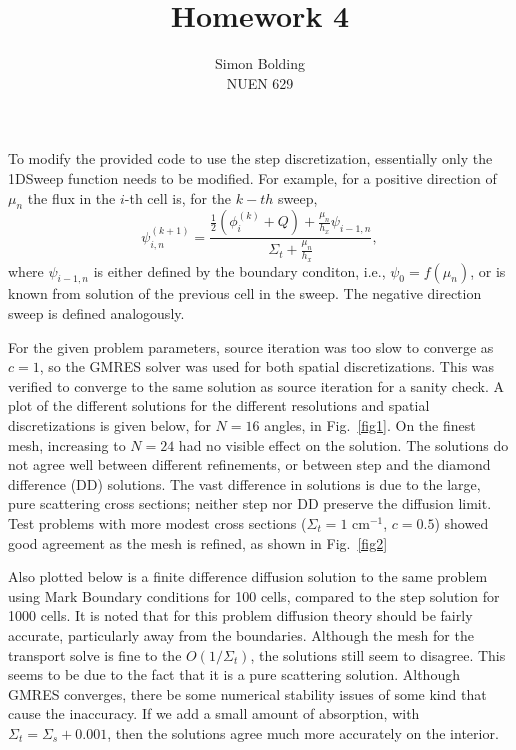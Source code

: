 \documentclass[12pt]{article}
\newenvironment{solnum}[2][Solution]{\begin{trivlist}
\item[\hskip \labelsep {\bfseries #1}\hskip \labelsep {\bfseries #2:}]\hspace{0.3in}\newline\newline}{\end{trivlist}}
\begin{document}
 
 
\title{Homework 4}%
\author{Simon Bolding\\ %
NUEN 629} %
 
\maketitle

\clearpage



\begin{solnum}{1-1}

To modify the provided code to use the step discretization, essentially only the
1DSweep function needs to be modified.  For example, for a positive direction of
$\mu_n$ the flux in the $i$-th cell is, for the $k-th$ sweep,
\begin{equation}
    \psi^{(k+1)}_{i,n} = \frac{\frac{1}{2}\left(\phi^{(k)}_i + Q\right) +
    \frac{\mu_n}{h_x}\psi_{i-1,n}}{\Sigma_t + \frac{\mu_n}{h_x}},
\end{equation}
where $\psi_{i-1,n}$ is either defined by the boundary conditon, i.e., $\psi_{0} =
f(\mu_n)$, or is known from solution of the previous cell in the sweep. The negative
direction sweep is defined analogously. 

For the given problem parameters, source iteration was too slow to converge as $c=1$, so the
GMRES solver was used for both spatial discretizations.  This was verified to
converge to the same solution as source iteration for a sanity check.  A plot of the
different solutions for the different resolutions and spatial discretizations is
given below, for $N=16$ angles, in Fig.~\ref{fig1}. On
the finest mesh, increasing to $N=24$ had no visible effect on the solution.  The
solutions do not agree well between different refinements, or between step and the
diamond difference (DD) solutions.  The vast difference in solutions is due to the
large, pure scattering cross sections; neither step nor DD preserve the diffusion
limit.  Test problems with more modest cross sections ($\Sigma_t=1$ cm$^{-1}$, $c=0.5$)
showed good agreement as the mesh is refined, as shown in Fig.~\ref{fig2}

 Also plotted below is a finite difference diffusion 
solution to the same problem using Mark Boundary conditions for 100 cells, compared
to the step solution for 1000 cells.  It is
noted that for this problem diffusion theory should be fairly accurate, particularly
away from the boundaries.  Although the mesh for the transport solve is fine to the $O(1/\Sigma_t)$, the
solutions still seem to disagree.  This seems to be due to the fact that it is a pure
scattering solution. Although GMRES converges, there be some numerical stability
issues of some kind that cause the inaccuracy.  If we add a small amount of
absorption, with $\Sigma_t = \Sigma_s+0.001$, then the solutions agree much more
accurately on the interior.  


\end{solnum}
\end{document}
